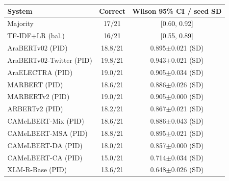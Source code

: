 \begin{tabular}{lcc}
\toprule
\textbf{System} & \textbf{Correct} & \textbf{Wilson 95\% CI / seed SD} \\
\midrule
Majority & 17/21 & [0.60, 0.92] \\
TF-IDF+LR (bal.) & 16/21 & [0.55, 0.89] \\
AraBERTv02 (PID) & 18.8/21 & 0.895$\pm$0.021 (SD) \\
AraBERTv02-Twitter (PID) & 19.8/21 & 0.943$\pm$0.021 (SD) \\
AraELECTRA (PID) & 19.0/21 & 0.905$\pm$0.034 (SD) \\
MARBERT (PID) & 18.6/21 & 0.886$\pm$0.026 (SD) \\
MARBERTv2 (PID) & 19.0/21 & 0.905$\pm$0.000 (SD) \\
ARBERTv2 (PID) & 18.2/21 & 0.867$\pm$0.021 (SD) \\
CAMeLBERT-Mix (PID) & 18.6/21 & 0.886$\pm$0.043 (SD) \\
CAMeLBERT-MSA (PID) & 18.8/21 & 0.895$\pm$0.021 (SD) \\
CAMeLBERT-DA (PID) & 18.0/21 & 0.857$\pm$0.000 (SD) \\
CAMeLBERT-CA (PID) & 15.0/21 & 0.714$\pm$0.034 (SD) \\
XLM-R-Base (PID) & 13.6/21 & 0.648$\pm$0.026 (SD) \\
\bottomrule
\end{tabular}

